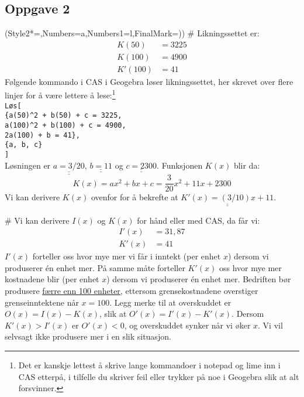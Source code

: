 \documentclass[12pt, a4paper]
{article}						%
\def\answer#1{\underline{\underline{#1}}}
\begin{document}
\subsection*{Oppgave 2}
\begin{easylist}[enumerate]
	\ListProperties(Style2*=,Numbers=a,Numbers1=l,FinalMark={)})
	# Likningssettet er:
	\begin{align*}
		K(50) &= 3225 \\
		K(100) &= 4900 \\
		K'(100) &= 41 
	\end{align*}
	Følgende kommando i CAS i Geogebra løser likningssettet, her skrevet over flere linjer for å være lettere å lese:\footnote{Det er kanskje lettest å skrive lange kommandoer i notepad og lime inn i CAS etterpå, i tilfelle du skriver feil eller trykker på noe i Geogebra slik at alt forsvinner.} \\
	\texttt{Løs[\\
		\{a(50)\textasciicircum2 + b(50) + c = 3225, \\ 
		a(100)\textasciicircum2 + b(100) + c = 4900, \\ 
		2a(100) + b = 41\}, \\
		\{a, b, c\}\\
		]} \\
	Løsningen er $\answer{a = 3/20}$, $\answer{b = 11}$ og $\answer{c = 2300}$. Funksjonen $K(x)$ blir da:
	\begin{equation*}
	K(x) = ax^2 + bx + c = \frac{3}{20}x^2 + 11x + 2300
	\end{equation*}
	Vi kan derivere $K(x)$ ovenfor for å bekrefte at $\answer{K'(x) = (3/10)x + 11}$.
	
	# Vi kan derivere $I(x)$ og $K(x)$ for hånd eller med CAS, da får vi:
	\begin{align*}
		I'(x) & = 31,87 \\
		K'(x) & = 41
	\end{align*}
	$I'(x)$ forteller oss hvor mye mer vi får i inntekt (per enhet $x$) dersom vi produserer én enhet mer. På samme måte forteller $K'(x)$ oss hvor mye mer kostnadene blir (per enhet $x$) dersom vi produserer én enhet mer.
	Bedriften bør produsere \answer{færre enn 100 enheter}, ettersom grensekostnadene overstiger grenseinntektene når $x = 100$.
	Legg merke til at overskuddet er $O(x) = I(x) - K(x)$, slik at $O'(x) = I'(x) - K'(x)$.
	Dersom $K'(x) > I'(x)$ er $O'(x) < 0$, og overskuddet synker når vi øker $x$. Vi vil selvsagt ikke produsere mer i en slik situasjon.
	

\end{easylist}
\end{document}
